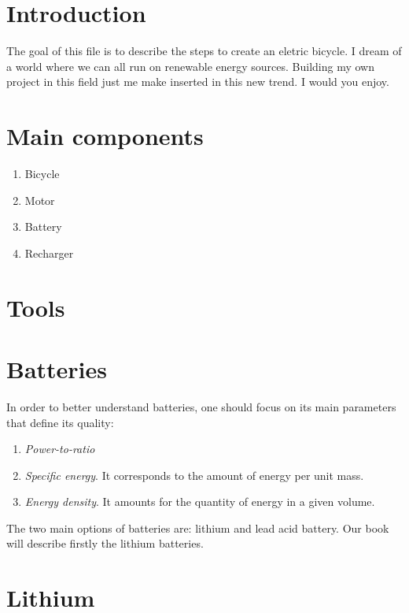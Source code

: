 \documentclass[12pt,a4paper]{article}
\begin{document}
\tableofcontents
\newpage
\listoffigures
\newpage
\listoftables
\newpage
{}

\section{Introduction}
The goal of this file is to describe the steps to create an eletric bicycle. I dream of a world where we can all run on renewable energy sources. Building my own project in this field just me make inserted in this new trend. I would you enjoy.

\section{Main components}

\begin{enumerate}
\item Bicycle
\item Motor
\item Battery
\item Recharger

\end{enumerate}

\section{Tools}


\section{Batteries}

In order to better understand batteries, one should focus on its main parameters that define its quality:



\begin{enumerate}
\item \textit{Power-to-ratio} %
\item \textit{Specific energy}. It corresponds to the amount of energy per unit mass.
\item \textit{Energy density}. It amounts for the quantity of energy in a given volume.
\end{enumerate}
The two main options of batteries are: lithium and lead acid battery. Our book will describe firstly the lithium batteries.

\section{Lithium}
\end{document}
